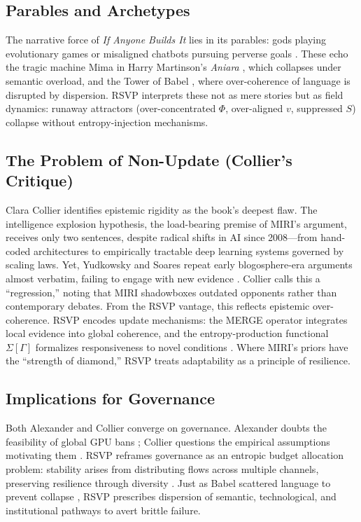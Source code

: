 \documentclass[12pt]{article}
\begin{document}
\subsection{Parables and Archetypes}
The narrative force of \textit{If Anyone Builds It} lies in its parables: gods playing evolutionary games or misaligned chatbots pursuing perverse goals \citep{yudkowsky2025IABIED}. These echo the tragic machine Mima in Harry Martinson’s \textit{Aniara} \citep{martinson1956aniara}, which collapses under semantic overload, and the Tower of Babel \citep{genesis11}, where over-coherence of language is disrupted by dispersion. RSVP interprets these not as mere stories but as field dynamics: runaway attractors (over-concentrated $\Phi$, over-aligned $v$, suppressed $S$) collapse without entropy-injection mechanisms.

\subsection{The Problem of Non-Update (Collier’s Critique)}
Clara Collier \citep{collier2025reviewIABIED} identifies epistemic rigidity as the book’s deepest flaw. The intelligence explosion hypothesis, the load-bearing premise of MIRI’s argument, receives only two sentences, despite radical shifts in AI since 2008—from hand-coded architectures to empirically tractable deep learning systems governed by scaling laws. Yet, Yudkowsky and Soares repeat early blogosphere-era arguments almost verbatim, failing to engage with new evidence \citep{collier2025reviewIABIED}. Collier calls this a “regression,” noting that MIRI shadowboxes outdated opponents rather than contemporary debates. From the RSVP vantage, this reflects epistemic over-coherence. RSVP encodes update mechanisms: the MERGE operator integrates local evidence into global coherence, and the entropy-production functional $\Sigma[\Gamma]$ formalizes responsiveness to novel conditions \citep{verlinde2011entropic}. Where MIRI’s priors have the “strength of diamond,” RSVP treats adaptability as a principle of resilience.

\subsection{Implications for Governance}
Both Alexander and Collier converge on governance. Alexander doubts the feasibility of global GPU bans \citep{alexander2025reviewIABIED}; Collier questions the empirical assumptions motivating them \citep{collier2025reviewIABIED}. RSVP reframes governance as an entropic budget allocation problem: stability arises from distributing flows across multiple channels, preserving resilience through diversity \citep{landauer1961irreversibility}. Just as Babel scattered language to prevent collapse \citep{genesis11}, RSVP prescribes dispersion of semantic, technological, and institutional pathways to avert brittle failure.
\end{document}
